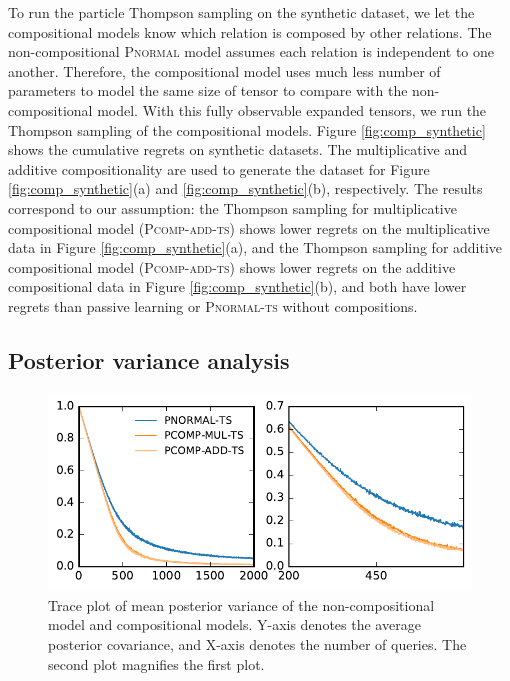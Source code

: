 To run the particle Thompson sampling on the synthetic dataset, we let the
compositional models know which relation is composed by other relations.
The non-compositional \textsc{Pnormal} model assumes each relation is independent to one another.
Therefore, the compositional model uses much less number of parameters to model
the same size of tensor to compare with the non-compositional model.
With this fully observable expanded tensors, we run the Thompson sampling of
the compositional models.
Figure \ref{fig:comp_synthetic} shows the cumulative regrets on synthetic
datasets. The multiplicative and additive compositionality are used to
generate the dataset for Figure \ref{fig:comp_synthetic}(a) and
\ref{fig:comp_synthetic}(b), respectively. The results correspond to our
assumption: the Thompson sampling for multiplicative compositional model (\textsc{Pcomp-add-ts}) shows lower
regrets on the multiplicative data in Figure \ref{fig:comp_synthetic}(a), and
the Thompson sampling for additive compositional model (\textsc{Pcomp-add-ts}) shows lower regrets on the
additive compositional data in Figure \ref{fig:comp_synthetic}(b),
and both have lower regrets than passive learning or \textsc{Pnormal-ts} without compositions.


\subsection{Posterior variance analysis}
\begin{figure}[t]
	\centering

	\includegraphics[width=0.9\linewidth]{images/posterior_variance_trace_kinship.pdf}

	\caption{\label{fig:pos_var} Trace plot of mean posterior variance of the non-compositional model and compositional models. Y-axis denotes the average posterior covariance, and X-axis denotes the number of queries. The second plot magnifies the first plot.}
\end{figure}

